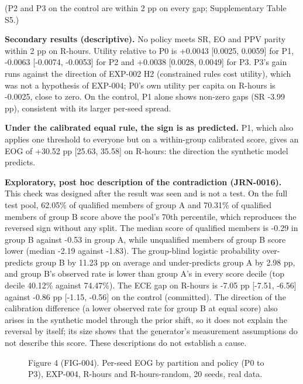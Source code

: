 \documentclass[
]{article}
\makeatletter
\newcommand*\pandocbounded[1]{%
  \sbox\pandoc@box{#1}%
  \Gscale@div\@tempa{\textheight}{\dimexpr\ht\pandoc@box+\dp\pandoc@box\relax}%
  \Gscale@div\@tempb{\linewidth}{\wd\pandoc@box}%
  \ifdim\@tempb\p@<\@tempa\p@\let\@tempa\@tempb\fi%
  \ifdim\@tempa\p@<\p@\scalebox{\@tempa}{\usebox\pandoc@box}%
  \else\usebox{\pandoc@box}%
  \fi%
}
\makeatother
\begin{document}
(P2 and P3 on the control are within 2 pp on every gap; Supplementary
Table S5.)

\textbf{Secondary results (descriptive).} No policy meets SR, EO and PPV
parity within 2 pp on R-hours. Utility relative to P0 is +0.0043
{[}0.0025, 0.0059{]} for P1, -0.0063 {[}-0.0074, -0.0053{]} for P2 and
+0.0038 {[}0.0028, 0.0049{]} for P3. P3's gain runs against the
direction of EXP-002 H2 (constrained rules cost utility), which was not
a hypothesis of EXP-004; P0's own utility per capita on R-hours is
-0.0025, close to zero. On the control, P1 alone shows non-zero gaps (SR
-3.99 pp), consistent with its larger per-seed spread.

\textbf{Under the calibrated equal rule, the sign is as predicted.} P1,
which also applies one threshold to everyone but on a within-group
calibrated score, gives an EOG of +30.52 pp {[}25.63, 35.58{]} on
R-hours: the direction the synthetic model predicts.

\textbf{Exploratory, post hoc description of the contradiction
(JRN-0016).} This check was designed after the result was seen and is
not a test. On the full test pool, 62.05\% of qualified members of group
A and 70.31\% of qualified members of group B score above the pool's
70th percentile, which reproduces the reversed sign without any split.
The median score of qualified members is -0.29 in group B against -0.53
in group A, while unqualified members of group B score lower (median
-2.19 against -1.83). The group-blind logistic probability over-predicts
group B by 11.23 pp on average and under-predicts group A by 2.98 pp,
and group B's observed rate is lower than group A's in every score
decile (top decile 40.12\% against 74.47\%). The ECE gap on R-hours is
-7.05 pp {[}-7.51, -6.56{]} against -0.86 pp {[}-1.15, -0.56{]} on the
control (committed). The direction of the calibration difference (a
lower observed rate for group B at equal score) also arises in the
synthetic model through the prior shift, so it does not explain the
reversal by itself; its size shows that the generator's measurement
assumptions do not describe this score. These descriptions do not
establish a cause.

\begin{figure}
\centering
\pandocbounded{}
\caption{Figure 4 (FIG-004). Per-seed EOG by partition and policy (P0 to
P3), EXP-004, R-hours and R-hours-random, 20 seeds, real data.}
\end{figure}
\end{document}
